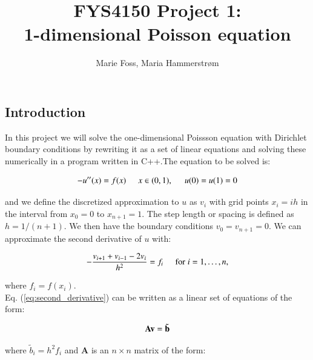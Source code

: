 \documentclass{article}
\title{\textbf{FYS4150 Project 1: \\1-dimensional Poisson equation}}
\author{Marie Foss, Maria Hammerstr{{\o}}m}
\date{} %
\begin{document}
\maketitle

\begin{abstract}
	\noindent \lipsum[1] 
	\vspace*{2ex}
\end{abstract}



\begin{multicols}{2}

\section{Introduction}
In this project we will solve the one-dimensional Poissson equation with Dirichlet boundary conditions by rewriting it as a set of linear equations and solving these numerically in a program written in C++.The equation to be solved is:

\begin{equation}\label{eq:Poisson}
	-u''(x) = f(x) \hspace{0.5cm} x\in(0,1), \hspace{0.5cm} u(0) = u(1) = 0
\end{equation}

\noindent and we define the discretized approximation  to $u$ as $v_i$  with grid points $x_i=ih$   in the interval from $x_0=0$ to $x_{n+1}=1$. The step length or spacing is defined as $h=1/(n+1)$. We then have the boundary conditions $v_0 = v_{n+1} = 0$. We can approximate the second derivative of $u$ with:

\begin{equation}\label{eq:second_derivative}
   -\frac{v_{i+1}+v_{i-1}-2v_i}{h^2} = f_i  \hspace{0.5cm} \mathrm{for} \hspace{0.1cm} i=1,\dots, n,
\end{equation}

\noindent where $f_i=f(x_i)$.\\

\noindent Eq. (\ref{eq:second_derivative}) can be written as a linear set of equations of the form: 

\begin{equation}
	{\bf A}{\bf v} = \tilde{{\bf b}}
\end{equation}

\noindent where $\tilde{b}_i=h^2f_i$ and \textbf{A} is an $n\times n$ matrix of the form:


\end{multicols}
\end{document}
